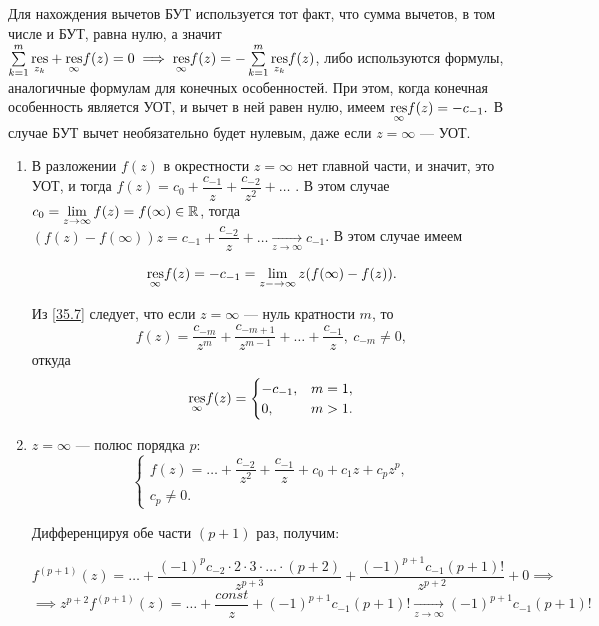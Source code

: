 \documentclass[../../main.tex]{subfiles}
\begin{document}
	 Для нахождения вычетов БУТ используется тот факт, что 
	 сумма вычетов, в том числе и БУТ, равна нулю, а значит 
	 $\sum\limits_{k=1}^m\underset{z_k}{\operatorname{res}}+\underset{\infty}{\operatorname{res}}f(z)=0 
	 \implies\underset{\infty}{\operatorname{res}}f(z) = -\sum\limits_{k=1}^m 
	 \underset{z_k}{\operatorname{res}}f(z)$, либо используются формулы, аналогичные формулам 
	 для 
	 конечных особенностей. При этом, когда конечная особенность является УОТ, и 
	 вычет в ней равен нулю, имеем 	${\underset{\infty}{\operatorname{res}}f(z)=-c_{-1}}.$ 
	 В случае БУТ
	 вычет необязательно будет нулевым, даже если $z=\infty$ --- УОТ.
	 
	 \begin{enumerate}
	 	\item 
		В разложении $f(z)$ в окрестности $z=\infty$ нет главной части, и 
	 	значит, это УОТ, и тогда $f(z)=c_0+\dfrac{c_{-1}}{z}+\dfrac{c_{-2}}{z^2}+ 
	 	\dots$ . В этом случае 
	 	$c_0=\lim\limits_{z\rightarrow \infty}f(z)=f(\infty)\in \mathbb{R}$, тогда 
	 	$(f(z)-f(\infty))z=c_{-1}+\dfrac{c_{-2}}{z}+ 
	 	\dots\underset{z\rightarrow\infty}{\rightarrow}c_{-1}$. В этом случае имеем 
	 	
	 	\begin{equation}\label{35.7}
	 	\underset{\infty}{\operatorname{res}}f(z)=-c_{-1}= 
	 	\lim\limits_{z-\rightarrow\infty}z(f(\infty)-f(z)).
	 	\end{equation}
	 	
	 	Из \eqref{35.7} следует, что если $z=\infty$ --- нуль кратности $m$, то 
	 	\[f(z)=\dfrac{c_{-m}}{z^m}+ \dfrac{c_{-m+1}}{z^{m-1}}+\dots+ 
	 	\dfrac{c_{-1}}{z},\ c_{-m}\neq0,\]
	 	откуда
	 	\[
	 	\underset{\infty}{\operatorname{res}}f(z)=
	 	\begin{cases}
	 		-c_{-1},& m=1,\\
	 		0,& m>1.
	 	\end{cases}
	 	\]
	 	
	 	\item
	 	$z=\infty$ --- полюс порядка $p$:
	 	\[
	 	\begin{cases}
	 	f(z)=\dots+\dfrac{c_{-2}}{z^2}+\dfrac{c_{-1}}{z}+c_0+c_1z+c_pz^p,\\
	 	c_p\neq0.
	 	\end{cases}
	 	\]
	 	
	 	Дифференцируя обе части $(p+1)$ раз, получим:
	 	
	 	\[
	 	f^{(p+1)}(z)=\dots+\dfrac{(-1)^{p}c_{-2}\cdot2\cdot3\cdot\dots 
	 	\cdot(p+2)}{z^{p+3}}+\dfrac{(-1)^{p+1}c_{-1}(p+1)!}{z^{p+2}}+0\implies\]
	 	\[\implies
	 	z^{p+2}f^{(p+1)}(z)=\dots+\dfrac{const}{z}+(-1)^{p+1}c_{-1}(p+1)! 
	 	\underset{z\rightarrow \infty}{\rightarrow}(-1)^{p+1}c_{-1}(p+1)!
	 	\]
	 	

\end{enumerate}
\end{document}

